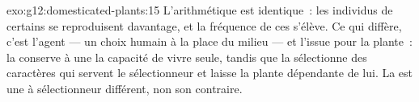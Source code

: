 \begin{solution}{exo:g12:domesticated-plants:15}
L'arithmétique est identique~: les individus  de certains
 se reproduisent davantage, et la fréquence de ces 
s'élève. Ce qui diffère, c'est l'agent --- un choix humain à la place
du milieu --- et l'issue pour la plante~: la 
conserve à une  la capacité de vivre seule, tandis que la
 sélectionne des caractères qui servent le sélectionneur
et laisse la plante dépendante de lui. La  est une
 à sélectionneur différent, non son contraire.
\end{solution}

